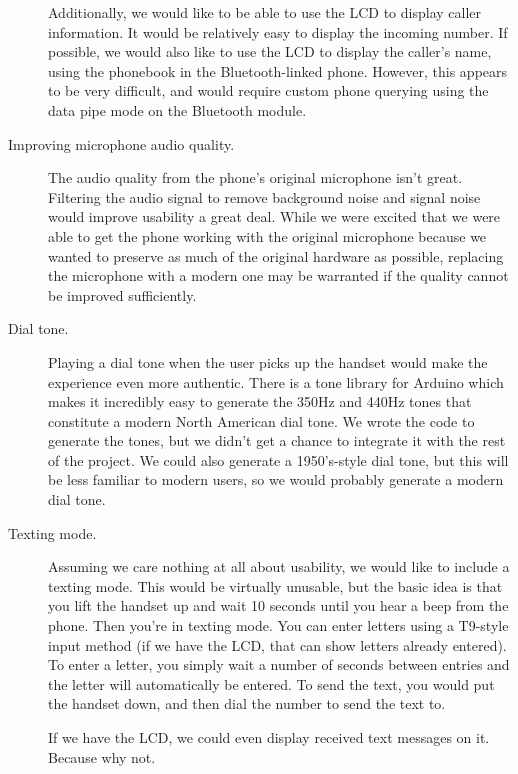 \documentclass{es50report}
\begin{document}
\begin{description}
                Additionally, we would like to be able to use the LCD to display caller information. It would be relatively easy to display the incoming number. If possible, we would also like to use the LCD to display the caller's name, using the phonebook in the Bluetooth-linked phone. However, this appears to be very difficult, and would require custom phone querying using the data pipe mode on the Bluetooth module.
            \item[Improving microphone audio quality.]
                The audio quality from the phone's original microphone isn't great. Filtering the audio signal to remove background noise and signal noise would improve usability a great deal. While we were excited that we were able to get the phone working with the original microphone because we wanted to preserve as much of the original hardware as possible, replacing the microphone with a modern one may be warranted if the quality cannot be improved sufficiently.
            \item[Dial tone.]
                Playing a dial tone when the user picks up the handset would make the experience even more authentic. There is a tone library for Arduino which makes it incredibly easy to generate the 350Hz and 440Hz tones that constitute a modern North American dial tone. We wrote the code to generate the tones, but we didn't get a chance to integrate it with the rest of the project. We could also generate a 1950's-style dial tone, but this will be less familiar to modern users, so we would probably generate a modern dial tone.
            \item[Texting mode.]
                Assuming we care nothing at all about usability, we would like to include a texting mode. This would be virtually unusable, but the basic idea is that you lift the handset up and wait 10 seconds until you hear a beep from the phone. Then you're in texting mode. You can enter letters using a T9-style input method (if we have the LCD, that can show letters already entered). To enter a letter, you simply wait a number of seconds between entries and the letter will automatically be entered. To send the text, you would put the handset down, and then dial the number to send the text to.

                If we have the LCD, we could even display received text messages on it. Because why not.
        \end{description}
\end{document}

